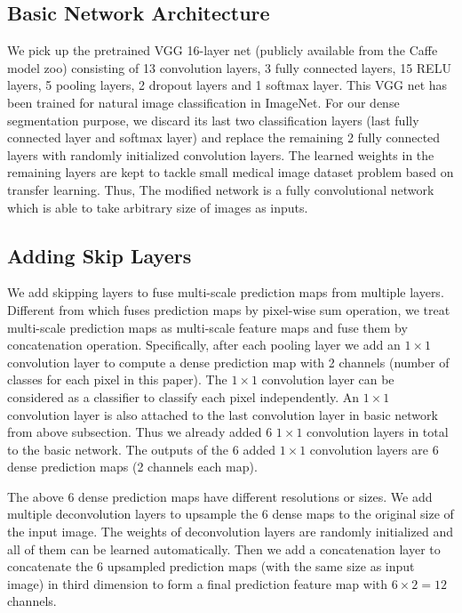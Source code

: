 \documentclass{article}
\begin{document}
\subsection{Basic Network Architecture}
 We pick up the pretrained VGG 16-layer net (publicly available from the Caffe model zoo) consisting of 13 convolution layers, 3 fully connected layers, 15 RELU layers, 5 pooling layers, 2 dropout layers and 1 softmax layer.  This VGG net has been trained for natural image classification in ImageNet. For our dense segmentation purpose, we discard its last two classification layers (last fully connected layer and softmax layer) and replace the remaining 2 fully connected layers with randomly initialized convolution layers. The learned weights in the remaining layers are kept to tackle small medical image dataset problem based on transfer learning. Thus, The modified network is a fully convolutional network which is able to take arbitrary size of images as inputs.

\subsection{Adding Skip Layers}
We add skipping layers to fuse multi-scale prediction maps from multiple layers. Different from \cite{Long2015FullyCN} which fuses prediction maps by pixel-wise sum operation, we treat multi-scale prediction maps as multi-scale feature maps and fuse them by concatenation operation. Specifically, after each pooling layer we add an $1\times1$ convolution layer to compute a dense prediction map with 2 channels (number of classes for each pixel in this paper). The $1\times1$ convolution layer can be considered as a classifier to classify each pixel independently\cite{Long2015FullyCN}.  An $1\times1$ convolution layer is also attached to the last convolution layer in basic network from above subsection. Thus we already added 6 $1\times1$ convolution layers in total to the basic network.  
The outputs of the 6 added $1\times1$ convolution layers are 6 dense prediction maps (2 channels each map).

The above 6 dense prediction maps have different resolutions or sizes. We add multiple deconvolution layers\cite{Long2015FullyCN} to upsample the 6 dense maps to the original size of the input image. The weights of deconvolution layers are randomly initialized and all of them can be learned automatically\cite{Long2015FullyCN}. Then we add a concatenation layer to concatenate the 6 upsampled prediction maps (with the same size as input image) in third dimension to form a final prediction feature map with $6\times2=12$ channels. 
\end{document}

